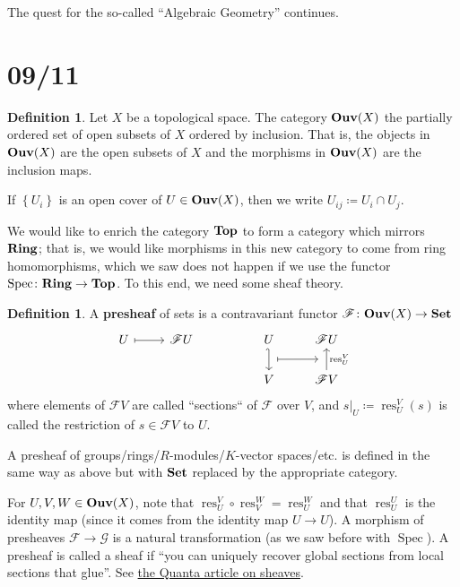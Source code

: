 \documentclass[11pt,leqno]{article}
\theoremstyle{plain}
\theoremstyle{definition}
\newtheorem{definition/}[lem]{Definition}
\newenvironment{definition}
  {\renewcommand{\qedsymbol}{\textdagger}%
   \pushQED{\qed}\begin{definition/}}
  {\popQED\end{definition/}}
\numberwithin{equation}{section}
\numberwithin{lem}{section}
\newcommand{\cbr}[1]{\left\{#1\right\}}
\newcommand{\bidx}[1]{\textbf{#1\index{#1}}} %
\DeclareMathOperator{\Spec}{Spec}
\DeclareMathOperator{\res}{res}
\newcommand{\catname}[1]{{\normalfont\mathbf{#1}}}
\newcommand{\Set}{\catname{Set}}
\newcommand{\Ring}{\catname{Ring}}
\newcommand{\Top}{\catname{Top}}
\newcommand{\Ouv}{\catname{Ouv}}
\begin{document}
The quest for the so-called ``Algebraic Geometry'' continues.

\newpage\section{09/11}
\begin{definition}
    Let $X$ be a topological space. The category \bidx{$\Ouv(X)$} the partially ordered set of open subsets of $X$ ordered by inclusion. That is, the objects in $\Ouv(X)$ are the open subsets of $X$ and the morphisms in $\Ouv(X)$ are the inclusion maps.
\end{definition}
If $\cbr{U_i}$ is an open cover of $U\in \Ouv(X)$, then we write $U_{ij}\coloneqq U_i\cap U_j$.

We would like to enrich the category $\Top$ to form a category which mirrors $\Ring$; that is, we would like morphisms in this new category to come from ring homomorphisms, which we saw does not happen if we use the functor $\Spec\colon\Ring \to\Top$. To this end, we need some sheaf theory.
\begin{definition}
    A \bidx{presheaf} of sets is a contravariant functor $\mathscr F\colon \Ouv(X)\to\Set$
    \begin{equation}
        \begin{tikzcd}
        	U & {\mathscr FU} && U & {\mathscr FU} \\
        	&&& V & {\mathscr FV}
        	\arrow[maps to, from=1-1, to=1-2]
        	\arrow[""{name=0, anchor=center, inner sep=0}, hook', from=1-4, to=2-4]
        	\arrow[""{name=1, anchor=center, inner sep=0}, "{\res^V_U}"', from=2-5, to=1-5]
        	\arrow[shorten <=6pt, shorten >=6pt, maps to, from=0, to=1]
        \end{tikzcd}
    \end{equation}
    where elements of $\mathscr FV$ are called ``sections`` of $\mathscr F$ over $V$, and $s|_U\coloneqq \res^V_U(s)$ is called the restriction of $s\in \mathscr FV$ to $U$. 

    A presheaf of groups/rings/$R$-modules/$K$-vector spaces/etc. is defined in the same way as above but with $\Set$ replaced by the appropriate category.
\end{definition}
For $U,V,W\in \Ouv(X)$, note that $\res^V_U\circ \res^W_V = \res^W_U$ and that $\res^U_U$ is the identity map (since it comes from the identity map $U\to U$).
A morphism of presheaves $\mathscr F\to\mathscr G$ is a natural transformation (as we saw before with $\Spec$).
A presheaf is called a sheaf if ``you can uniquely recover global sections from local sections that glue''. See \href{https://www.quantamagazine.org/what-are-sheaves-20240719/}{the Quanta article on sheaves}.
\end{document}
